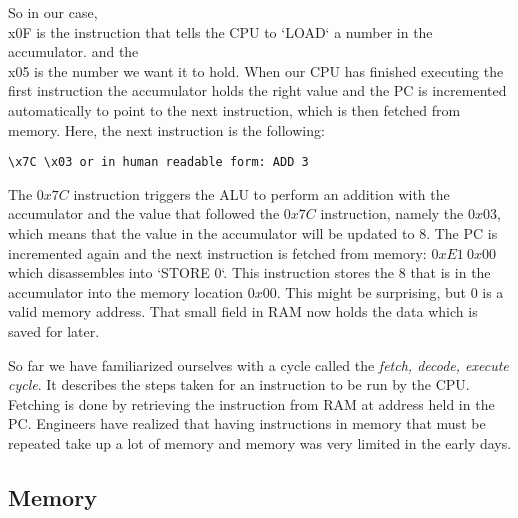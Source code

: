 So in our case, \\x0F is the instruction that tells the CPU to `LOAD` a number in the accumulator.
and the \\x05 is the number we want it to hold. When our CPU has finished executing the first
instruction the accumulator holds the right value and the PC is incremented automatically to point
to the next instruction, which is then fetched from memory. Here, the next instruction is the
following:

\begin{lstlisting}
\x7C \x03 or in human readable form: ADD 3
\end{lstlisting}

The $0x7C$ instruction triggers the ALU to perform an addition with the accumulator and
the value that followed the $0x7C$ instruction, namely the $0x03$, which means that the value
in the accumulator will be updated to 8. The PC is incremented again and the next instruction is
fetched from memory: $0xE1\ 0x00$ which disassembles into `STORE 0`. This instruction stores the 8 
that is in the accumulator into the memory location $0x00$. This might be surprising, but 0 is a
valid memory address. That small field in RAM now holds the data which is saved for later.

So far we have familiarized ourselves with a cycle called the \textit{fetch, decode, execute cycle}. It 
describes the steps taken for an instruction to be run by the CPU. Fetching is done by retrieving
the instruction from RAM at address held in the PC. Engineers have realized that having instructions in memory that must be repeated take up a lot of memory
and memory was very limited in the early days.

\subsection{Memory}

